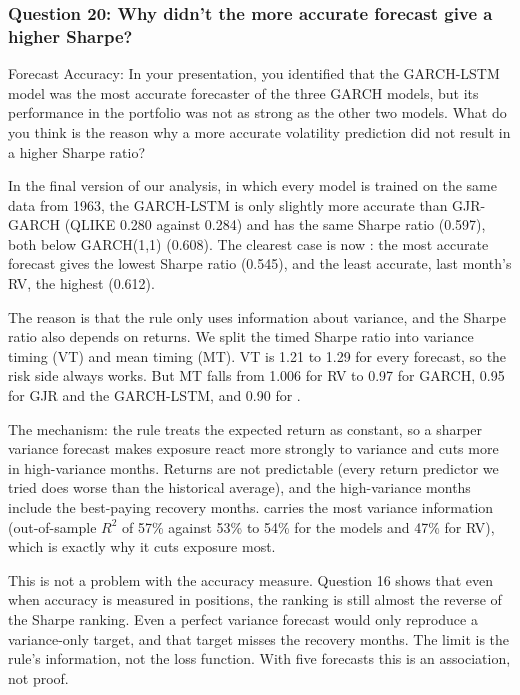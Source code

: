 \subsubsection*{Question 20: Why didn't the more accurate forecast give a higher Sharpe?}
\begin{question}
Forecast Accuracy: In your presentation, you identified that the GARCH-LSTM model was the most accurate forecaster of the three GARCH models, but its performance in the portfolio was not as strong as the other two models. What do you think is the reason why a more accurate volatility prediction did not result in a higher Sharpe ratio?
\end{question}
In the final version of our analysis, in which every model is trained on the same data from 1963, the GARCH-LSTM is only slightly more accurate than GJR-GARCH (QLIKE 0.280 against 0.284) and has the same Sharpe ratio (0.597), both below GARCH(1,1) (0.608). The clearest case is now \VIX: the most accurate forecast gives the lowest Sharpe ratio (0.545), and the least accurate, last month's RV, the highest (0.612).

The reason is that the rule only uses information about variance, and the Sharpe ratio also depends on returns. We split the timed Sharpe ratio into variance timing (VT) and mean timing (MT). VT is 1.21 to 1.29 for every forecast, so the risk side always works. But MT falls from 1.006 for RV to 0.97 for GARCH, 0.95 for GJR and the GARCH-LSTM, and 0.90 for \VIX.

The mechanism: the rule treats the expected return as constant, so a sharper variance forecast makes exposure react more strongly to variance and cuts more in high-variance months. Returns are not predictable (every return predictor we tried does worse than the historical average), and the high-variance months include the best-paying recovery months. \VIX{} carries the most variance information (out-of-sample $R^2$ of 57\% against 53\% to 54\% for the models and 47\% for RV), which is exactly why it cuts exposure most.

This is not a problem with the accuracy measure. Question 16 shows that even when accuracy is measured in positions, the ranking is still almost the reverse of the Sharpe ranking. Even a perfect variance forecast would only reproduce a variance-only target, and that target misses the recovery months. The limit is the rule's information, not the loss function. With five forecasts this is an association, not proof.

